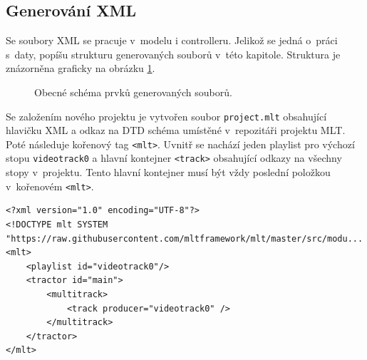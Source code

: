 \subsection{Generování XML}
Se soubory XML se pracuje v~modelu i controlleru. Jelikož se jedná o~práci s~daty, popíšu strukturu generovaných souborů v~této kapitole. Struktura je znázorněna graficky na obrázku \ref{img:schemaXML}.
\begin{figure}[h]
	\centering
	\caption{Obecné schéma prvků generovaných souborů.}\label{img:schemaXML}
\end{figure}

Se založením nového projektu je vytvořen soubor \texttt{project.mlt} obsahující hlavičku XML a odkaz na DTD schéma umístěné v~repozitáři projektu MLT. Poté následuje kořenový tag \texttt{<mlt>}. Uvnitř se nachází jeden playlist pro výchozí stopu \texttt{videotrack0} a hlavní kontejner \texttt{<track>} obsahující odkazy na všechny stopy v~projektu. Tento hlavní kontejner musí být vždy poslední položkou v~kořenovém \texttt{<mlt>}.
\begin{lstlisting}[style=xml]
<?xml version="1.0" encoding="UTF-8"?>
<!DOCTYPE mlt SYSTEM "https://raw.githubusercontent.com/mltframework/mlt/master/src/modu...
<mlt>
    <playlist id="videotrack0"/>
    <tractor id="main">
        <multitrack>
            <track producer="videotrack0" />
        </multitrack>
    </tractor>
</mlt>
\end{lstlisting}

